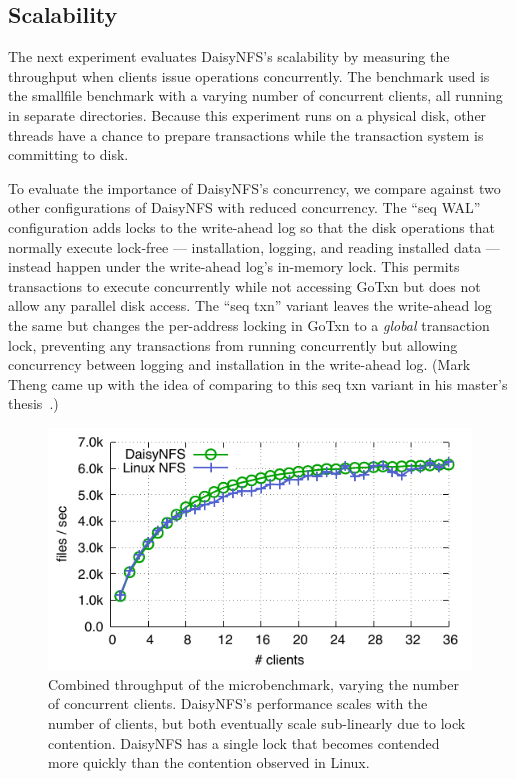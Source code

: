 \subsection{Scalability}

The next experiment evaluates DaisyNFS's scalability by measuring the throughput
when clients issue operations concurrently. The benchmark used is the smallfile
benchmark with a varying number of concurrent clients, all running in separate
directories. Because this experiment runs on a physical disk, other threads have
a chance to prepare transactions while the transaction system is committing to
disk.

To evaluate the importance of DaisyNFS's concurrency, we compare against two
other configurations of DaisyNFS with reduced concurrency. The ``seq WAL'' configuration
adds locks to the write-ahead log so that the disk operations that normally
execute lock-free --- installation, logging, and reading installed data ---
instead happen under the write-ahead log's in-memory lock. This permits
transactions to execute concurrently while not accessing GoTxn but does not
allow any parallel disk access. The ``seq txn'' variant leaves the write-ahead
log the same but changes the per-address locking in GoTxn to a \emph{global}
transaction lock, preventing any transactions from running concurrently but
allowing concurrency between logging and installation in the write-ahead log.
(Mark Theng came up with the idea of comparing to this seq txn variant in his
master's thesis~\cite{mtheng-meng}.)

\begin{figure}[ht]
  \centering
  \includegraphics{daisy-nfs/fig/scale.pdf}
  \vspace{0.5\baselineskip}
  \caption[Concurrent smallfile performance]%
  {Combined throughput of the  microbenchmark, varying the number
    of concurrent clients. DaisyNFS's performance scales with the number of
    clients, but both eventually scale sub-linearly due to lock contention. DaisyNFS has a single lock that becomes contended more quickly than the contention observed in Linux.}
  \label{fig:eval:scale}
\end{figure}

